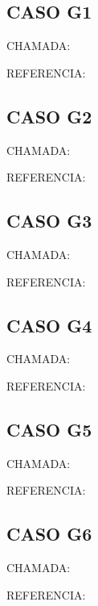 \documentclass{undftex}
\begin{document}
\begin{refsection}\section*{CASO G1} CHAMADA: \par REFERENCIA:\par\printbibliography[heading=none]\end{refsection}\clearpage
\begin{refsection}\section*{CASO G2} CHAMADA: \par REFERENCIA:\par\printbibliography[heading=none]\end{refsection}\clearpage
\begin{refsection}\section*{CASO G3} CHAMADA: \par REFERENCIA:\par\printbibliography[heading=none]\end{refsection}\clearpage
\begin{refsection}\section*{CASO G4} CHAMADA: \par REFERENCIA:\par\printbibliography[heading=none]\end{refsection}\clearpage
\begin{refsection}\section*{CASO G5} CHAMADA: \par REFERENCIA:\par\printbibliography[heading=none]\end{refsection}\clearpage
\begin{refsection}\section*{CASO G6} CHAMADA: \par REFERENCIA:\par\printbibliography[heading=none]\end{refsection}\clearpage
\end{document}
